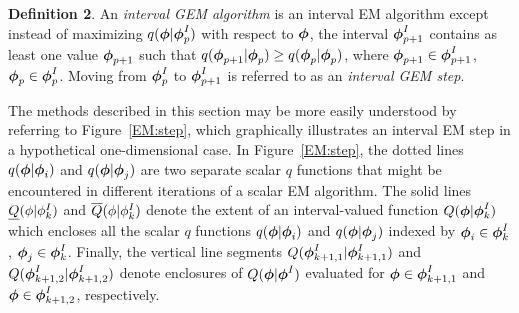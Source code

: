 \documentclass[10pt,twoside]{article}
\begin{document}
{\bf Definition 2}.   An {\it interval GEM algorithm}
is an interval EM algorithm except instead
of maximizing $q(\mbox{\boldmath $\phi$}|\mbox{\boldmath $\phi$}^I_p)$ with respect to $\mbox{\boldmath $\phi$}$, the interval 
$\mbox{\boldmath $\phi$}^I_{p+1}$ contains
as least one value $\mbox{\boldmath $\phi$}_{p+1}$ such that 
$q(\mbox{\boldmath $\phi$}_{p+1} | \mbox{\boldmath $\phi$}_p ) \geq q(\mbox{\boldmath $\phi$}_p |\mbox{\boldmath $\phi$}_p )$,
where $\mbox{\boldmath $\phi$}_{p+1} \in \mbox{\boldmath $\phi$}^I_{p+1}$,
$\mbox{\boldmath $\phi$}_p \in \mbox{\boldmath $\phi$}^I_p$.  Moving from $\mbox{\boldmath $\phi$}_p^I$ to $\mbox{\boldmath $\phi$}_{p+1}^I$ 
is referred to
as an {\it interval GEM step}.

The methods described in this section 
may be more easily understood by referring to
Figure~\ref{EM:step}, which graphically illustrates an interval EM step in a
hypothetical one-dimensional case. 
In Figure~\ref{EM:step}, the dotted lines
$q(\mbox{\boldmath $\phi$}|\mbox{\boldmath $\phi$}_i)$ and $q(\mbox{\boldmath $\phi$}|\mbox{\boldmath $\phi$}_j)$ are
two separate scalar $q$ functions that might be encountered in different
iterations of a scalar EM algorithm.  The solid lines 
$\protect\underline{Q}(\phi|\phi^I_k)$ and 
$\protect\overline{Q}(\phi|\phi^I_k)$ denote the extent of 
an interval-valued function $Q(\mbox{\boldmath $\phi$}|\mbox{\boldmath $\phi$}^I_k)$ 
which encloses all the scalar
$q$ functions $q(\mbox{\boldmath $\phi$}|\mbox{\boldmath $\phi$}_i)$ and $q(\mbox{\boldmath $\phi$}|\mbox{\boldmath $\phi$}_j)$ 
indexed by $\mbox{\boldmath $\phi$}_i \in \mbox{\boldmath $\phi$}^I_k$, $\mbox{\boldmath $\phi$}_j \in \mbox{\boldmath $\phi$}^I_k$.
Finally, the vertical line segments $Q(\mbox{\boldmath $\phi$}_{k+1,1}^I|\mbox{\boldmath $\phi$}_{k+1,1}^I)$
and 
$Q(\mbox{\boldmath $\phi$}_{k+1,2}^I|\mbox{\boldmath $\phi$}_{k+1,2}^I)$ 
denote enclosures of $Q(\mbox{\boldmath $\phi$}|\mbox{\boldmath $\phi$}^I)$ 
evaluated for $\mbox{\boldmath $\phi$} \in \mbox{\boldmath $\phi$}_{k+1,1}^I$ and $\mbox{\boldmath $\phi$} \in
\mbox{\boldmath $\phi$}_{k+1,2}^I$,
respectively.
\end{document}

